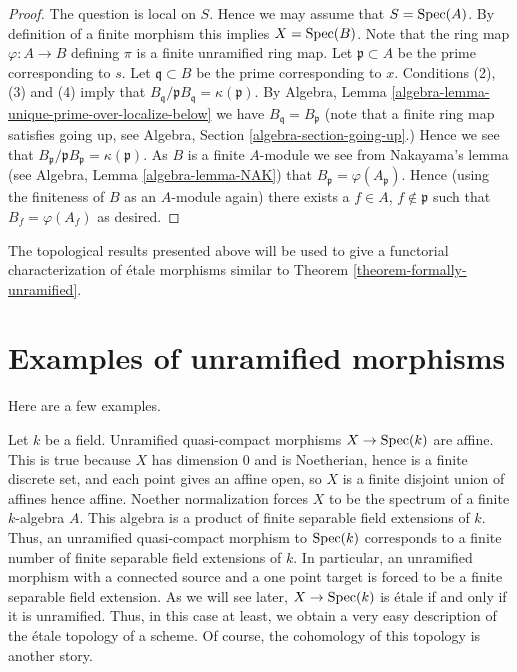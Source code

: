 \begin{proof}
The question is local on $S$. Hence we may assume that $S = \mathop{\mathrm{Spec}}(A)$.
By definition of a finite morphism this implies $X = \mathop{\mathrm{Spec}}(B)$.
Note that the ring map $\varphi : A \to B$ defining $\pi$
is a finite unramified ring map.
Let $\mathfrak p \subset A$ be the prime corresponding to $s$.
Let $\mathfrak q \subset B$ be the prime corresponding to $x$.
Conditions (2), (3) and (4) imply that
$B_{\mathfrak q}/\mathfrak pB_{\mathfrak q} = \kappa(\mathfrak p)$.
By Algebra, Lemma \ref{algebra-lemma-unique-prime-over-localize-below}
we have $B_{\mathfrak q} = B_{\mathfrak p}$
(note that a finite ring map satisfies going up, see
Algebra, Section \ref{algebra-section-going-up}.)
Hence we see that
$B_{\mathfrak p}/\mathfrak pB_{\mathfrak p} = \kappa(\mathfrak p)$.
As $B$ is a finite $A$-module we see from Nakayama's lemma (see
Algebra, Lemma \ref{algebra-lemma-NAK})
that $B_{\mathfrak p} = \varphi(A_{\mathfrak p})$. Hence (using the finiteness
of $B$ as an $A$-module again) there exists a
$f \in A$, $f \not \in \mathfrak p$ such that $B_f = \varphi(A_f)$
as desired.
\end{proof}

\noindent
The topological results presented above will be used to give a functorial
characterization of \'etale morphisms similar to Theorem
\ref{theorem-formally-unramified}.




\section{Examples of unramified morphisms}
\label{section-examples}

\noindent
Here are a few examples.

\begin{example}
\label{example-etale-field-extensions}
Let $k$ be a field.
Unramified quasi-compact morphisms $X \to \mathop{\mathrm{Spec}}(k)$ are affine.
This is true because $X$ has dimension $0$ and is Noetherian,
hence is a finite discrete set, and each point gives an affine open,
so $X$ is a finite disjoint union of affines hence affine.
Noether normalization forces $X$ to be the spectrum of a finite
$k$-algebra $A$.
This algebra is a product of finite separable field extensions of $k$.
Thus, an unramified quasi-compact morphism to $\mathop{\mathrm{Spec}}(k)$
corresponds to a finite number of finite separable field extensions of $k$.
In particular, an unramified morphism with a connected source and a one point
target is forced to be a finite separable field extension.
As we will see later, $X \to \mathop{\mathrm{Spec}}(k)$ is \'etale if and
only if it is unramified. Thus, in this case at least, we obtain a very easy
description of the \'etale topology of a scheme. Of course, the cohomology of
this topology is another story.
\end{example}

